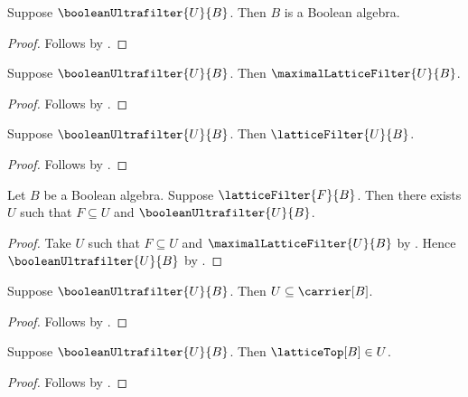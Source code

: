 \begin{proposition}\label{boolean_ultrafilter_ambient}
    Suppose $\booleanUltrafilter{U}{B}$.
    Then $B$ is a Boolean algebra.
\end{proposition}
\begin{proof}
    Follows by .
\end{proof}

\begin{proposition}\label{boolean_ultrafilter_is_maximal_lattice_filter}
    Suppose $\booleanUltrafilter{U}{B}$.
    Then $\maximalLatticeFilter{U}{B}$.
\end{proposition}
\begin{proof}
    Follows by .
\end{proof}

\begin{proposition}\label{boolean_ultrafilter_is_lattice_filter}
    Suppose $\booleanUltrafilter{U}{B}$.
    Then $\latticeFilter{U}{B}$.
\end{proposition}
\begin{proof}
    Follows by
        .
\end{proof}

\begin{theorem}\label{boolean_ultrafilter_extension}
    Let $B$ be a Boolean algebra.
    Suppose $\latticeFilter{F}{B}$.
    Then there exists $U$ such that $F\subseteq U$ and
        $\booleanUltrafilter{U}{B}$.
\end{theorem}
\begin{proof}
    Take $U$ such that $F\subseteq U$ and
        $\maximalLatticeFilter{U}{B}$ by
        .
    Hence $\booleanUltrafilter{U}{B}$ by
        .
\end{proof}

\begin{proposition}\label{boolean_ultrafilter_subseteq_carrier}
    Suppose $\booleanUltrafilter{U}{B}$.
    Then $U\subseteq\carrier[B]$.
\end{proposition}
\begin{proof}
    Follows by
        .
\end{proof}

\begin{proposition}\label{boolean_ultrafilter_top}
    Suppose $\booleanUltrafilter{U}{B}$.
    Then $\latticeTop[B]\in U$.
\end{proposition}
\begin{proof}
    Follows by
        .
\end{proof}

